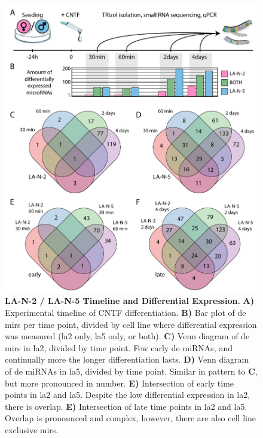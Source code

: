 \begin{figure} 
\includegraphics[width=\textwidth]{figures/timepoints-expr-venn}
\caption[Timeline Differential Expression.]{\textbf{LA-N-2 / LA-N-5 Timeline and Differential Expression.} \textbf{A)} Experimental timeline of CNTF differentiation. \textbf{B)} Bar plot of \acf{de} \acp{mir} per time point, divided by cell line where differential expression was measured (\ac{la2} only, \ac{la5} only, or both). \textbf{C)} Venn diagram of \ac{de} \acp{mir} in \ac{la2}, divided by time point. Few early \ac{de} miRNAs, and continually more the longer differentiation lasts. \textbf{D)} Venn diagram of \ac{de} miRNAs in \ac{la5}, divided by time point. Similar in pattern to \textbf{C}, but more pronounced in number. \textbf{E)} Intersection of early time points in \ac{la2} and \ac{la5}. Despite the low differential expression in \ac{la2}, there is overlap. \textbf{E)} Intersection of late time points in \ac{la2} and \ac{la5}. Overlap is pronounced and complex, however, there are also cell line exclusive \acp{mir}.
\label{fig:timepoints-expr-venn}}
\end{figure}

